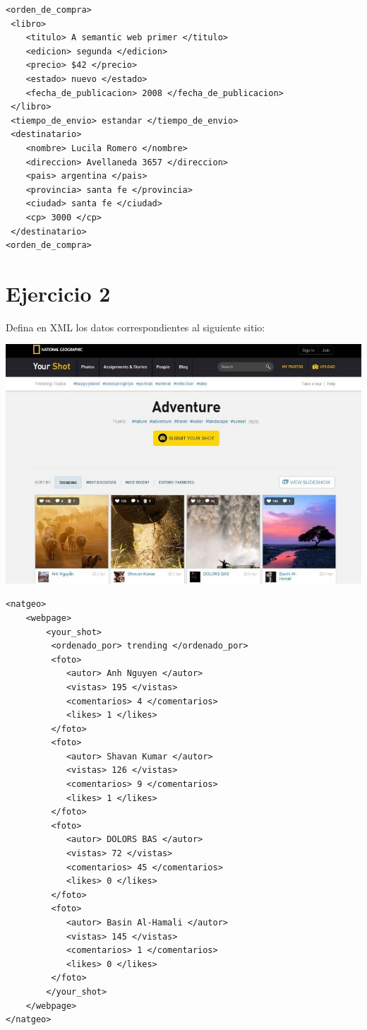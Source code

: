 \documentclass[a4paper,12pt,twoside,final,spanish]{article}
\begin{document}
\begin{lstlisting}
<orden_de_compra>
 <libro>
 	<titulo> A semantic web primer </titulo>
 	<edicion> segunda </edicion>
 	<precio> $42 </precio>
 	<estado> nuevo </estado>
 	<fecha_de_publicacion> 2008 </fecha_de_publicacion>
 </libro>
 <tiempo_de_envio> estandar </tiempo_de_envio>
 <destinatario>
 	<nombre> Lucila Romero </nombre>
 	<direccion> Avellaneda 3657 </direccion>
 	<pais> argentina </pais>
 	<provincia> santa fe </provincia>
 	<ciudad> santa fe </ciudad>
 	<cp> 3000 </cp>
 </destinatario>
<orden_de_compra>
\end{lstlisting}

\section*{Ejercicio 2}

Defina en XML los datos correspondientes al siguiente sitio: 

\begin{center}
\includegraphics[width=0.9\linewidth,keepaspectratio]{3}
\end{center}

\dotfill

\begin{lstlisting}
<natgeo>
	<webpage>
		<your_shot>
		 <ordenado_por> trending </ordenado_por>
		 <foto>
		 	<autor> Anh Nguyen </autor>
		 	<vistas> 195 </vistas>
		 	<comentarios> 4 </comentarios>
		 	<likes> 1 </likes>
		 </foto>
		 <foto>
		 	<autor> Shavan Kumar </autor>
		 	<vistas> 126 </vistas>
		 	<comentarios> 9 </comentarios>
		 	<likes> 1 </likes>
		 </foto>
		 <foto>
		 	<autor> DOLORS BAS </autor>
		 	<vistas> 72 </vistas>
		 	<comentarios> 45 </comentarios>
		 	<likes> 0 </likes>
		 </foto>
		 <foto>
		 	<autor> Basin Al-Hamali </autor>
		 	<vistas> 145 </vistas>
		 	<comentarios> 1 </comentarios>
		 	<likes> 0 </likes>
		 </foto>
		</your_shot>
	</webpage>
</natgeo>
\end{lstlisting}
\end{document}
